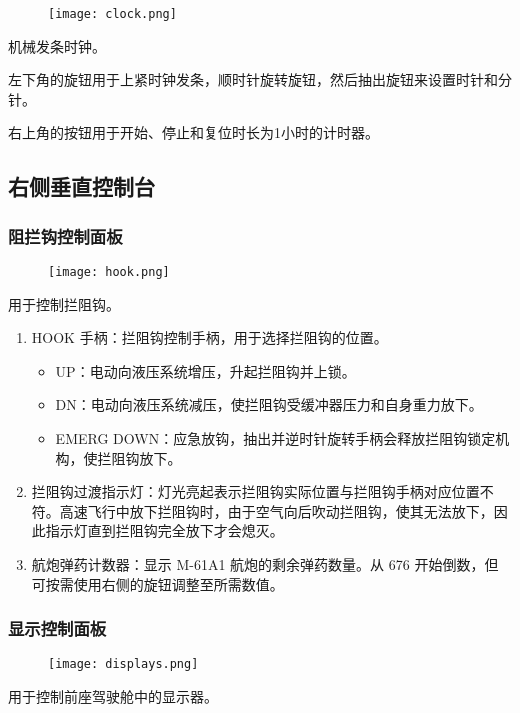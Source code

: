 \begin{figure}[htb]
  \center
  \texttt{[image: clock.png]}
\end{figure}
机械发条时钟。

左下角的旋钮用于上紧时钟发条，顺时针旋转旋钮，然后抽出旋钮来设置时针和分针。

右上角的按钮用于开始、停止和复位时长为1小时的计时器。

\subsection{右侧垂直控制台}

\subsubsection{阻拦钩控制面板}

\begin{figure}[htb]
  \center
  \texttt{[image: hook.png]}
\end{figure}
用于控制拦阻钩。

\begin{enumerate}
  \item HOOK 手柄：拦阻钩控制手柄，用于选择拦阻钩的位置。
  \begin{itemize}
    \item UP：电动向液压系统增压，升起拦阻钩并上锁。 
    \item DN：电动向液压系统减压，使拦阻钩受缓冲器压力和自身重力放下。
    \item EMERG DOWN：应急放钩，抽出并逆时针旋转手柄会释放拦阻钩锁定机构，使拦阻钩放下。
  \end{itemize}
  \item 拦阻钩过渡指示灯：灯光亮起表示拦阻钩实际位置与拦阻钩手柄对应位置不符。高速飞行中放下拦阻钩时，由于空气向后吹动拦阻钩，使其无法放下，因此指示灯直到拦阻钩完全放下才会熄灭。
  \item 航炮弹药计数器：显示 M-61A1 航炮的剩余弹药数量。从 676 开始倒数，但可按需使用右侧的旋钮调整至所需数值。
\end{enumerate}

\subsubsection{显示控制面板}

\begin{figure}[htb]
  \center
  \texttt{[image: displays.png]}
\end{figure}
用于控制前座驾驶舱中的显示器。

